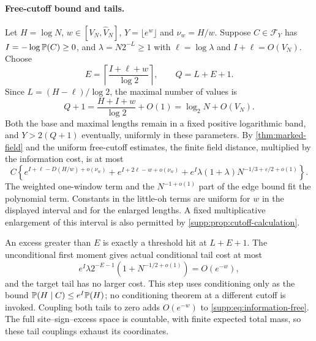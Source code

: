 \paragraph{Free-cutoff bound and tails.}
Let $H=\log N$, $w\in[V_N,\widehat V_N]$, $Y=\lfloor e^w\rfloor$
and $\nu_w=H/w$. Suppose $C\in\mathcal F_Y$ has
$I=-\log\mathbb P(C)\ge0$, and $\lambda=N2^{-L}\ge1$ with
$\ell=\log\lambda$ and $I+\ell=O(V_N)$. Choose
\[
 E=\left\lceil\frac{I+\ell+w}{\log2}\right\rceil,
 \qquad Q=L+E+1.
\]
Since $L=(H-\ell)/\log2$, the maximal number of values is
\[
 Q+1=\frac{H+I+w}{\log2}+O(1)=\log_2N+O(V_N).
\]
Both the base and maximal lengths remain in a fixed positive logarithmic
band, and $Y>2(Q+1)$ eventually, uniformly in these parameters.
By \cref{thm:marked-field} and the uniform free-cutoff estimates, the
finite field distance, multiplied by the information cost, is at most
\begin{equation}\label{supp:eq:information-free}
 C\left\{
 e^{I+\ell-D(H/w)+o(\nu_w)}+
 e^{I+2\ell-w+o(\nu_w)}+
 e^I\lambda(1+\lambda)N^{-1/3+\varepsilon/2+o(1)}
 \right\}.
\end{equation}
The weighted one-window term and the $N^{-1+o(1)}$ part of the edge
bound fit the polynomial term. Constants in the little-oh terms are
uniform for $w$ in the displayed interval and for the enlarged lengths.
A fixed multiplicative enlargement of this interval is also permitted by
\cref{supp:prop:cutoff-calculation}.

An excess greater than $E$ is exactly a threshold hit at $L+E+1$.
The unconditional first moment gives actual conditional tail cost at most
\[
 e^I\lambda2^{-E-1}(1+N^{-1/2+o(1)})=O(e^{-w}),
\]
and the target tail has no larger cost. This step uses conditioning only
as the bound $\mathbb P(H\mid C)\le e^I\mathbb P(H)$; no conditioning theorem at
a different cutoff is invoked. Coupling both tails to zero adds
$O(e^{-w})$ to \eqref{supp:eq:information-free}. The full site--sign--excess
space is countable, with finite expected total mass, so these tail
couplings exhaust its coordinates.

